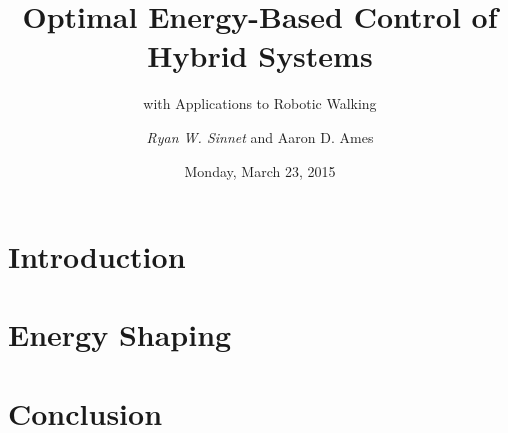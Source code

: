 \documentclass{beamer}
\title[Energy Shaping]{Optimal Energy-Based Control of Hybrid Systems}
\subtitle{with Applications to Robotic Walking}
\author{\emph{Ryan W. Sinnet} and Aaron D. Ames}
\institute{Department of Mechanical Engineering\\ Texas A\&M University}
\date{Monday, March 23, 2015}
\begin{document}
\frame{\titlepage}



\section{Introduction}
\showtoc



\section{Energy Shaping}
\showtoc

\section{Conclusion}
\showtoc
\end{document}
